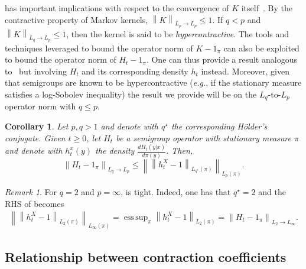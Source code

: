 \documentclass[11pt]{article}
\DeclareMathOperator*{\esssup}{ess\,sup}
\theoremstyle{plain}
\newtheorem{corollary}{Corollary}[section]
\theoremstyle{remark}
\newtheorem{remark}{Remark}
\begin{document}
  has important implications with respect to the convergence of $K$ itself~\cite{logSobMarkovChains}. 
  By the contractive property of Markov kernels, %
  $\left\lVert K \right\rVert_{L_p\to L_p} \leq 1$. If $q < p$ and $\left\lVert K \right\rVert_{L_q\to L_p} \leq 1$, then the kernel is said to be \emph{hypercontractive}.  The tools and techniques leveraged to bound the operator norm of $K-1_\pi$ can also be exploited to bound the operator norm of $H_t-1_\pi$. One can thus provide a result analogous to~ but involving $H_t$ and its corresponding density $h_t$ instead. Moreover, given that semigroups are known to be hypercontractive (\textit{e.g.}, if the stationary measure satisfies a log-Sobolev inequality) the result we provide will be on the $L_q$-to-$L_p$ operator norm with $q\leq p$. 
  \begin{corollary}
      \label{thm:boundSemigroupHyper}
      Let $p,q>1$ and denote with $q^\star$ the corresponding H\"older's conjugate.  Given $t\geq0$, let $H_t$ be a semigroup operator with stationary measure $\pi$ and  denote with $h_t^x(y)$ the density $\frac{dH_t(y|x)}{d\pi(y)}$. Then,
      \begin{equation}
          \left\lVert H_t-1_\pi \right\rVert_{L_q\to L_p} \leq \left\lVert \left\lVert h_t^X-1 \right\rVert_{L_{q^\star}(\pi)} \right\rVert_{L_{p}(\pi)}. \label{eq:boundSemigroupHyper}
      \end{equation}
  \end{corollary}
  \begin{remark}
      For $q=2$ and $p=\infty$,  is tight. Indeed, one has that $q^\star=2$ and the RHS of  becomes
      \begin{align*}
          \left\lVert \left\lVert h_t^X-1 \right\rVert_{L_{2}(\pi)} \right\rVert_{L_{\infty}(\pi)}= \esssup_\pi \left\lVert h_t^X-1 \right\rVert_{L_{2}(\pi)} = \left\lVert H_t-1_\pi \right\rVert_{L_2\to L_\infty}.
      \end{align*}
  \end{remark}\fi
\subsection{Relationship between contraction coefficients}\label{app:contractionCoefficientsRelationship}
\end{document}
